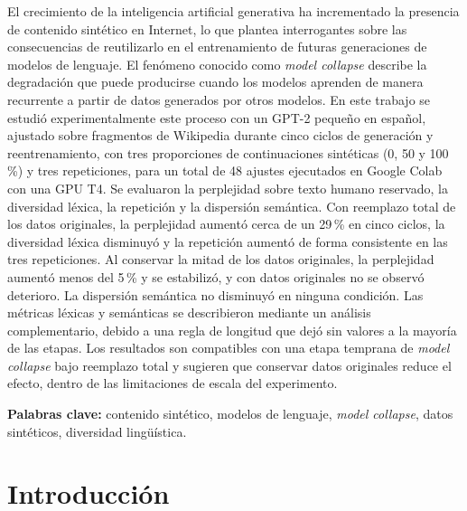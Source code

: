\documentclass[12pt,letterpaper]{article}
\begin{document}
\vspace{0.5cm}

\justifying

El crecimiento de la inteligencia artificial generativa ha incrementado la
presencia de contenido sintético en Internet, lo que plantea interrogantes
sobre las consecuencias de reutilizarlo en el entrenamiento de futuras
generaciones de modelos de lenguaje. El fenómeno conocido como
\textit{model collapse} describe la degradación que puede producirse cuando
los modelos aprenden de manera recurrente a partir de datos generados por
otros modelos. En este trabajo se estudió experimentalmente este proceso con
un GPT-2 pequeño en español, ajustado sobre fragmentos de Wikipedia durante
cinco ciclos de generación y reentrenamiento, con tres proporciones de
continuaciones sintéticas (0, 50 y 100\,\%) y tres repeticiones, para un
total de 48 ajustes ejecutados en Google Colab con una GPU T4. Se evaluaron la
perplejidad sobre texto humano reservado, la diversidad léxica, la
repetición y la dispersión semántica. Con reemplazo total de los datos
originales, la perplejidad aumentó cerca de un 29\,\% en cinco ciclos, la
diversidad léxica disminuyó y la repetición aumentó de forma consistente en
las tres repeticiones. Al conservar la mitad de los datos originales, la
perplejidad aumentó menos del 5\,\% y se estabilizó, y con datos originales
no se observó deterioro. La dispersión semántica no disminuyó en ninguna
condición. Las métricas léxicas y semánticas se describieron mediante un
análisis complementario, debido a una regla de longitud que dejó sin valores
a la mayoría de las etapas. Los resultados son compatibles con una etapa
temprana de \textit{model collapse} bajo reemplazo total y sugieren que
conservar datos originales reduce el efecto, dentro de las limitaciones de
escala del experimento.

\vspace{0.7cm}

\noindent
\textbf{Palabras clave:}
contenido sintético,
modelos de lenguaje,
\textit{model collapse},
datos sintéticos,
diversidad lingüística.

\clearpage
{}
\setcounter{page}{1}
\section{Introducción}
\end{document}
